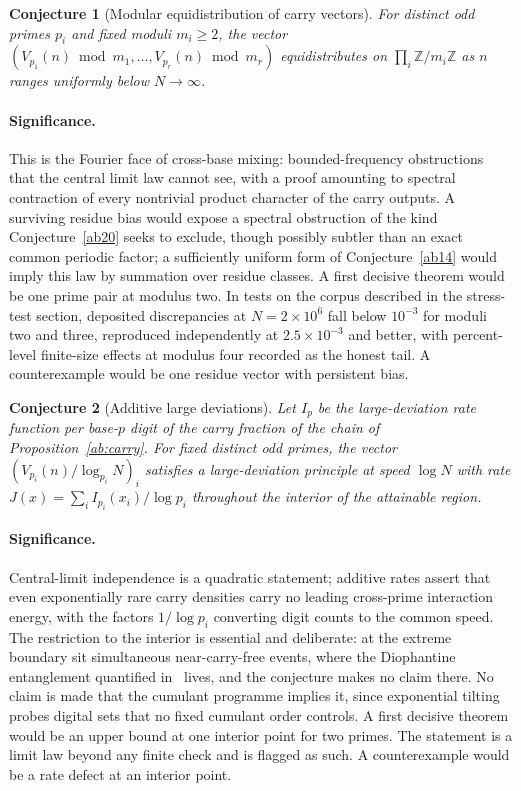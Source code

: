 \documentclass[11pt]{article}
\newtheorem{conjecture}{Conjecture}
\theoremstyle{definition}
\newcommand{\Z}{\mathbb Z}
\providecommand{\Z}{\mathbb Z}
\begin{document}
\begin{conjecture}[Modular equidistribution of carry vectors]\label{ab15}
For distinct odd primes $p_i$ and fixed moduli $m_i\ge2$, the vector $(V_{p_1}(n)\bmod m_1,\ldots,V_{p_r}(n)\bmod m_r)$ equidistributes on $\prod_i\Z/m_i\Z$ as $n$ ranges uniformly below $N\to\infty$.
\end{conjecture}

\paragraph{Significance.}
This is the Fourier face of cross-base mixing: bounded-frequency obstructions that the central limit law cannot see, with a proof amounting to spectral contraction of every nontrivial product character of the carry outputs.  A surviving residue bias would expose a spectral obstruction of the kind Conjecture~\ref{ab20} seeks to exclude, though possibly subtler than an exact common periodic factor; a sufficiently uniform form of Conjecture~\ref{ab14} would imply this law by summation over residue classes.  A first decisive theorem would be one prime pair at modulus two.  In tests on the corpus described in the stress-test section, deposited discrepancies at $N=2\times10^6$ fall below $10^{-3}$ for moduli two and three, reproduced independently at $2.5\times10^{-3}$ and better, with percent-level finite-size effects at modulus four recorded as the honest tail.  A counterexample would be one residue vector with persistent bias.

\begin{conjecture}[Additive large deviations]\label{ab16}
Let $I_p$ be the large-deviation rate function per base-$p$ digit of the carry fraction of the chain of Proposition~\ref{ab:carry}.  For fixed distinct odd primes, the vector $(V_{p_i}(n)/\log_{p_i}N)_i$ satisfies a large-deviation principle at speed $\log N$ with rate $J(x)=\sum_iI_{p_i}(x_i)/\log p_i$ throughout the interior of the attainable region.
\end{conjecture}

\paragraph{Significance.}
Central-limit independence is a quadratic statement; additive rates assert that even exponentially rare carry densities carry no leading cross-prime interaction energy, with the factors $1/\log p_i$ converting digit counts to the common speed.  The restriction to the interior is essential and deliberate: at the extreme boundary sit simultaneous near-carry-free events, where the Diophantine entanglement quantified in~\cite{CMS22} lives, and the conjecture makes no claim there.  No claim is made that the cumulant programme implies it, since exponential tilting probes digital sets that no fixed cumulant order controls.  A first decisive theorem would be an upper bound at one interior point for two primes.  The statement is a limit law beyond any finite check and is flagged as such.  A counterexample would be a rate defect at an interior point.
\end{document}
